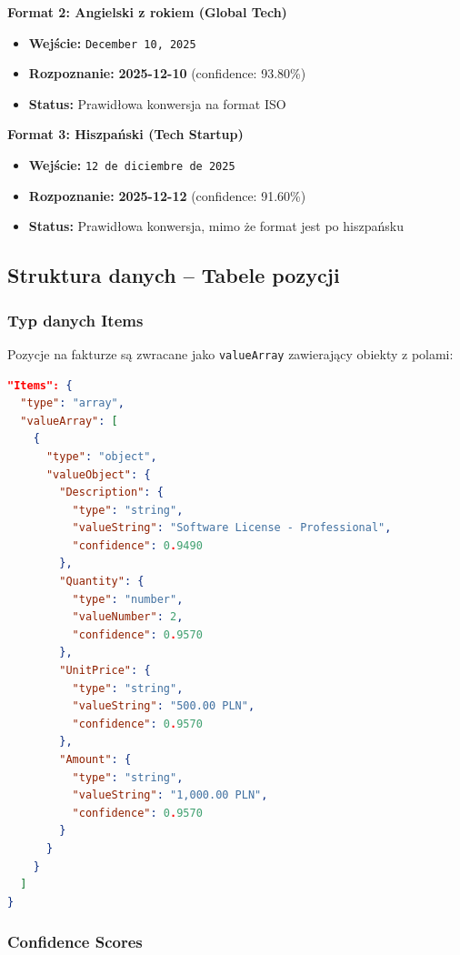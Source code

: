 \textbf{Format 2: Angielski z rokiem (Global Tech)}
\begin{itemize}
	\item \textbf{Wejście:} \texttt{December 10, 2025}
	\item \textbf{Rozpoznanie:} \textbf{2025-12-10} (confidence: 93.80\%)
	\item \textbf{Status:} Prawidłowa konwersja na format ISO
\end{itemize}

\textbf{Format 3: Hiszpański (Tech Startup)}
\begin{itemize}
	\item \textbf{Wejście:} \texttt{12 de diciembre de 2025}
	\item \textbf{Rozpoznanie:} \textbf{2025-12-12} (confidence: 91.60\%)
	\item \textbf{Status:} Prawidłowa konwersja, mimo że format jest po hiszpańsku
\end{itemize}

\subsection{Struktura danych – Tabele pozycji}

\subsubsection{Typ danych Items}

Pozycje na fakturze są zwracane jako \texttt{valueArray} zawierający obiekty z polami:

\begin{lstlisting}[language=json, caption=Struktura Items w JSON]
"Items": {
  "type": "array",
  "valueArray": [
    {
      "type": "object",
      "valueObject": {
        "Description": {
          "type": "string",
          "valueString": "Software License - Professional",
          "confidence": 0.9490
        },
        "Quantity": {
          "type": "number",
          "valueNumber": 2,
          "confidence": 0.9570
        },
        "UnitPrice": {
          "type": "string",
          "valueString": "500.00 PLN",
          "confidence": 0.9570
        },
        "Amount": {
          "type": "string",
          "valueString": "1,000.00 PLN",
          "confidence": 0.9570
        }
      }
    }
  ]
}
\end{lstlisting}

\subsubsection{Confidence Scores}

